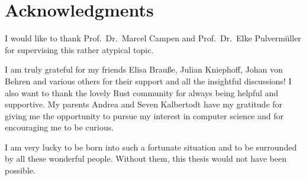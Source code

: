 \chapter*{Acknowledgments}

I would like to thank Prof.\ Dr.\ Marcel Campen and Prof.\ Dr.\ Elke Pulvermüller for supervising this rather atypical topic.

I am truly grateful for my friends Elisa Brauße, Julian Kniephoff, Johan von Behren and various others for their support and all the insightful discussions!
I also want to thank the lovely Rust community for always being helpful and supportive.
My parents Andrea and Seven Kalbertodt have my gratitude for giving me the opportunity to pursue my interest in computer science and for encouraging me to be curious.

I am very lucky to be born into such a fortunate situation and to be surrounded by all these wonderful people.
Without them, this thesis would not have been possible.
